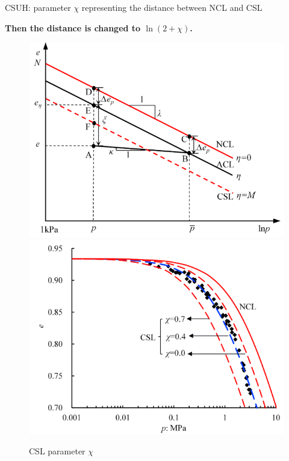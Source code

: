 \documentclass[aspectratio=169]{beamer}
\begin{document}
\begin{frame}{CSUH: parameter $\chi$ representing the distance between NCL and CSL}
\begin{minipage}[c]{0.6\linewidth}
		\vspace{-2mm}
		\textbf{Then the distance is changed to $\ln \left(2+\chi\right)$.}
	\end{minipage}
	\vspace{2mm}
	\begin{minipage}[c]{0.36\linewidth}
		\begin{figure}
			\centering
			\includegraphics[width=0.7\linewidth]{./pic/e_eta calculation.jpg}
			\includegraphics[width=0.75\linewidth]{./pic/csl parameter chi.jpg}
			\caption{CSL parameter $\chi$}
			\label{fig: chi meaning}
		\end{figure}
	\end{minipage}
\end{frame}
\end{document}
